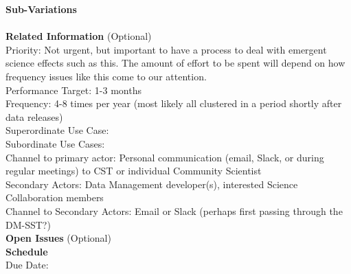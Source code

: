 {\bf Sub-Variations} \\
\\

{\bf Related Information} (Optional) \\
Priority: Not urgent, but important to have a process to deal with emergent science effects such as this.  The amount of effort to be spent will depend on how frequency issues like this come to our attention. \\
Performance Target: 1-3 months \\
Frequency: 4-8 times per year (most likely all clustered in a period shortly after data releases) \\
Superordinate Use Case:  \\
Subordinate Use Cases: \\
Channel to primary actor: Personal communication (email, Slack, or during regular meetings) to CST or individual Community Scientist \\
Secondary Actors: Data Management developer(s), interested Science Collaboration members \\
Channel to Secondary Actors: Email or Slack (perhaps first passing through the DM-SST?) \\

{\bf Open Issues} (Optional) \\

{\bf Schedule} \\
Due Date: \\

